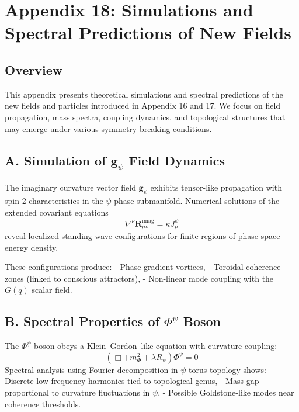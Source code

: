 


\appendix
\section*{Appendix 18: Simulations and Spectral Predictions of New Fields}

\subsection*{Overview}
This appendix presents theoretical simulations and spectral predictions of the new fields and particles introduced in Appendix 16 and 17. We focus on field propagation, mass spectra, coupling dynamics, and topological structures that may emerge under various symmetry-breaking conditions.

\subsection*{A. Simulation of $\mathbf{g}_\psi$ Field Dynamics}
The imaginary curvature vector field $\mathbf{g}_\psi$ exhibits tensor-like propagation with spin-2 characteristics in the $\psi$-phase submanifold. Numerical solutions of the extended covariant equations
\[
\nabla^\nu \mathbf{R}_{\mu\nu}^{\mathrm{imag}} = \kappa J_\mu^\psi
\]
reveal localized standing-wave configurations for finite regions of phase-space energy density.

These configurations produce:
- Phase-gradient vortices,
- Toroidal coherence zones (linked to conscious attractors),
- Non-linear mode coupling with the $G(q)$ scalar field.

\subsection*{B. Spectral Properties of $\Phi^\psi$ Boson}
The $\Phi^\psi$ boson obeys a Klein–Gordon–like equation with curvature coupling:
\[
\left( \Box + m_\Phi^2 + \lambda R_\psi \right)\Phi^\psi = 0
\]
Spectral analysis using Fourier decomposition in $\psi$-torus topology shows:
- Discrete low-frequency harmonics tied to topological genus,
- Mass gap proportional to curvature fluctuations in $\psi$,
- Possible Goldstone-like modes near coherence thresholds.

